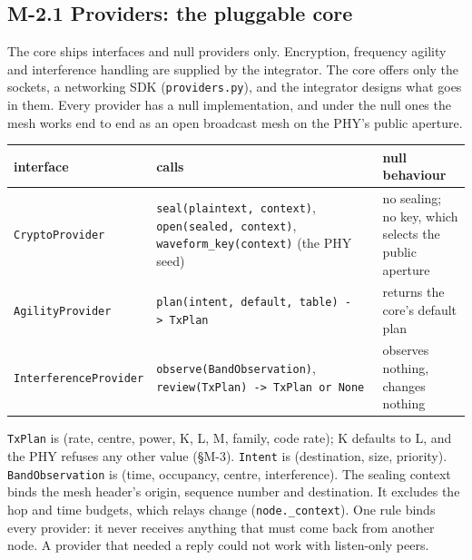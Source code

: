 \documentclass[10pt,letterpaper,twocolumn]{article}
\begin{document}
\subsection{M-2.1 Providers: the pluggable core}\label{m-21-providers-the-pluggable-core}

The core ships interfaces and null providers only. Encryption, frequency agility and interference handling are supplied by the integrator. The core offers only the sockets, a networking SDK (\texttt{providers.\allowbreak{}py}), and the integrator designs what goes in them. Every provider has a null implementation, and under the null ones the mesh works end to end as an open broadcast mesh on the PHY's public aperture.

\begin{table}[tp]
\centering\footnotesize
\begin{tabular}{L{0.200\textwidth}L{0.487\textwidth}L{0.263\textwidth}}
\toprule
interface & calls & null behaviour \\
\midrule
\texttt{CryptoProvider} & \texttt{seal(\allowbreak{}plaintext,\allowbreak{}\ context)\allowbreak{}},
\texttt{open(\allowbreak{}sealed,\allowbreak{}\ context)\allowbreak{}},
\texttt{waveform\_\allowbreak{}key(\allowbreak{}context)\allowbreak{}}
(the PHY seed) & no sealing; no key, which selects the public aperture \\
\texttt{AgilityProvider} & \texttt{plan(\allowbreak{}intent,\allowbreak{}\ default,\allowbreak{}\ table)\allowbreak{}\ -{}\allowbreak{}\textgreater{}\allowbreak{}\ TxPlan} & returns the core's default plan \\
\texttt{InterferenceProvider} & \texttt{observe(\allowbreak{}BandObservation)\allowbreak{}},
\texttt{review(\allowbreak{}TxPlan)\allowbreak{}\ -{}\allowbreak{}\textgreater{}\allowbreak{}\ TxPlan\ or\ None} & observes nothing, changes nothing \\
\bottomrule
\end{tabular}
\end{table}

\texttt{TxPlan} is (rate, centre, power, K, L, M, family, code rate); K defaults to L, and the PHY refuses any other value (§M-3). \texttt{Intent} is (destination, size, priority). \texttt{BandObservation} is (time, occupancy, centre, interference). The sealing context binds the mesh header's origin, sequence number and destination. It excludes the hop and time budgets, which relays change (\texttt{node.\allowbreak{}\_\allowbreak{}context}). One rule binds every provider: it never receives anything that must come back from another node. A provider that needed a reply could not work with listen-only peers.
\end{document}
